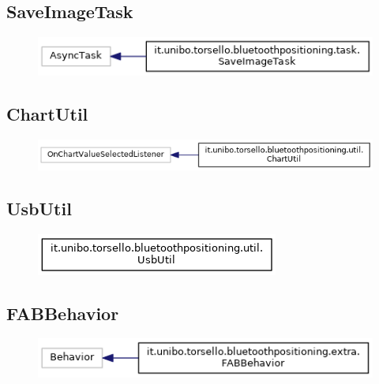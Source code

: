 \newpage
\subsection{SaveImageTask}
\begin{figure}[ph]
	\centering
	\includegraphics[scale=.55]{img/uml/inherit_graph/inherit_graph_15.png}
	\caption[]{}
\end{figure}

\newpage
\subsection{ChartUtil}
\begin{figure}[ph]
	\centering
	\includegraphics[scale=.55]{img/uml/inherit_graph/inherit_graph_17.png}
	\caption[]{}
\end{figure}

\newpage
\subsection{UsbUtil}
\begin{figure}[ph]
	\centering
	\includegraphics[scale=.55]{img/uml/inherit_graph/inherit_graph_18.png}
	\caption[]{}
\end{figure}

\newpage
\subsection{FABBehavior}
\begin{figure}[ph]
	\centering
	\includegraphics[scale=.55]{img/uml/inherit_graph/inherit_graph_9.png}
	\caption[]{}
\end{figure}
